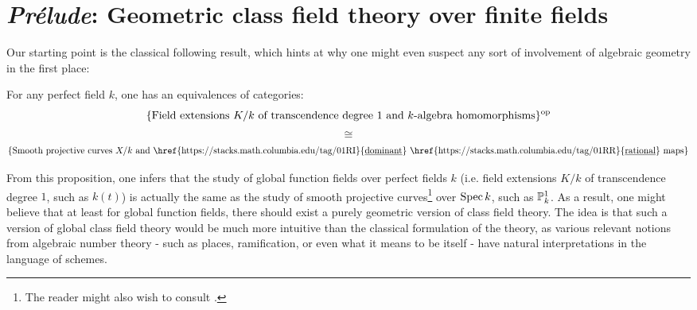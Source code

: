 \section{\textit{Pr\'elude}: Geometric class field theory over finite fields}
    Our starting point is the classical following result, which hints at why one might even suspect any sort of involvement of algebraic geometry in the first place:
        \begin{proposition} \label{prop: curves_and_function_fields}
            \cite[\href{https://stacks.math.columbia.edu/tag/0BY1}{Tag 0BY1}]{stacks} For any perfect field $k$, one has an equivalences of categories:
                $$\{\text{Field extensions $K/k$ of transcendence degree $1$ and $k$-algebra homomorphisms}\}^{\op}$$
                $$\cong$$
                $$\{\text{Smooth projective curves $X/k$ and \href{https://stacks.math.columbia.edu/tag/01RI}{\underline{dominant}} \href{https://stacks.math.columbia.edu/tag/01RR}{\underline{rational}} maps}\}$$
        \end{proposition}
        From this proposition, one infers that the study of global function fields over perfect fields $k$ (i.e. field extensions $K/k$ of transcendence degree $1$, such as $k(t)$) is actually the same as the study of smooth projective curves\footnote{The reader might also wish to consult \cite[Sections I.13 and I.14]{neukirch_2010_algebraic_number_theory}.} over $\Spec k$, such as $\P^1_k$. As a result, one might believe that at least for global function fields, there should exist a purely geometric version of class field theory. The idea is that such a version of global class field theory would be much more intuitive than the classical formulation of the theory, as various relevant notions from algebraic number theory - such as places, ramification, or even what it means to be  itself - have natural interpretations in the language of schemes. 
        

